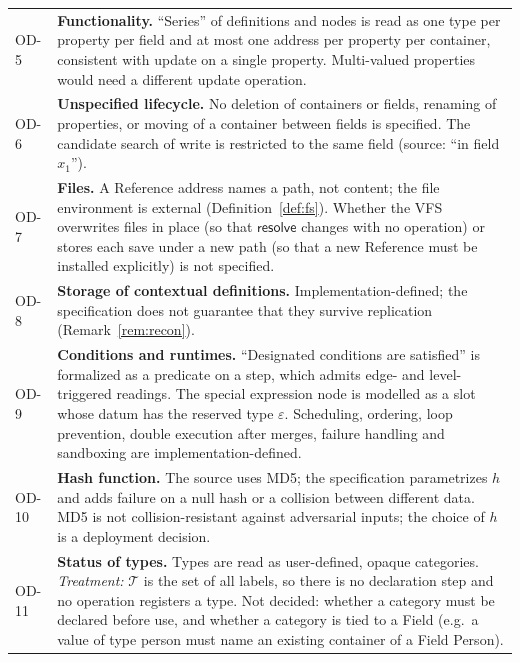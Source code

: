 \documentclass[11pt,a4paper]{article}
\theoremstyle{definition}
\theoremstyle{plain}
\theoremstyle{remark}
\newcommand{\Typ}{\mathcal{T}}
\newcommand{\tExp}{\varepsilon}
\begin{document}
\begin{longtable}{@{}l p{}@{}}
OD-5 & \textbf{Functionality.} ``Series'' of definitions and nodes is read as one type per property per field and at most one address per property per container, consistent with \textsf{update} on a single property. Multi-valued properties would need a different update operation.\\
OD-6 & \textbf{Unspecified lifecycle.} No deletion of containers or fields, renaming of properties, or moving of a container between fields is specified. The candidate search of \textsf{write} is restricted to the same field (source: ``in field $x_1$'').\\
OD-7 & \textbf{Files.} A Reference address names a path, not content; the file environment is external (Definition~\ref{def:fs}). Whether the VFS overwrites files in place (so that $\mathsf{resolve}$ changes with no operation) or stores each save under a new path (so that a new Reference must be installed explicitly) is not specified.\\
OD-8 & \textbf{Storage of contextual definitions.} Implementation-defined; the specification does not guarantee that they survive replication (Remark~\ref{rem:recon}).\\
OD-9 & \textbf{Conditions and runtimes.} ``Designated conditions are satisfied'' is formalized as a predicate on a step, which admits edge- and level-triggered readings. The special expression node is modelled as a slot whose datum has the reserved type $\tExp$. Scheduling, ordering, loop prevention, double execution after merges, failure handling and sandboxing are implementation-defined.\\
OD-10 & \textbf{Hash function.} The source uses MD5; the specification parametrizes $h$ and adds failure on a null hash or a collision between different data. MD5 is not collision-resistant against adversarial inputs; the choice of $h$ is a deployment decision.\\
OD-11 & \textbf{Status of types.} Types are read as user-defined, opaque categories. \emph{Treatment:} $\Typ$ is the set of all labels, so there is no declaration step and no operation registers a type. Not decided: whether a category must be declared before use, and whether a category is tied to a Field (e.g.\ a value of type \textsf{person} must name an existing container of a Field \textsf{Person}).\\
\bottomrule
\end{longtable}

\appendix
\end{document}
